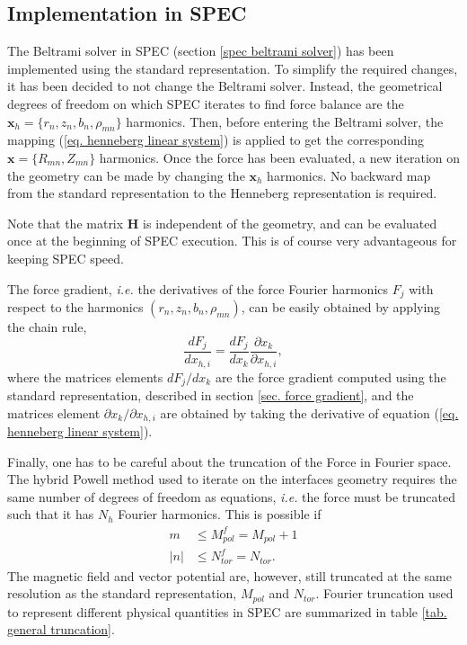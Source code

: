 \documentclass[my_thesis.tex]{subfiles}
\begin{document}
\subsection{Implementation in SPEC}
The Beltrami solver in SPEC (section \ref{spec beltrami solver}) has been implemented using the standard representation. To simplify the required changes, it has been decided to not change the Beltrami solver. Instead, the geometrical degrees of freedom on which SPEC iterates to find force balance are the $\mathbf{x}_h=\{r_n,z_n,b_n,\rho_{mn}\}$ harmonics. Then, before entering the Beltrami solver, the mapping (\ref{eq. henneberg linear system}) is applied to get the corresponding $\mathbf{x}=\{R_{mn},Z_{mn}\}$ harmonics. Once the force has been evaluated, a new iteration on the geometry can be made by changing the $\mathbf{x}_h$ harmonics. No backward map from the standard representation to the Henneberg representation is required.

Note that the matrix $\mathbf{H}$ is independent of the geometry, and can be evaluated once at the beginning of SPEC execution. This is of course very advantageous for keeping SPEC speed.

The force gradient, \textit{i.e.} the derivatives of the force Fourier harmonics $F_j$ with respect to the harmonics $(r_n,z_n,b_n,\rho_{mn})$, can be easily obtained by applying the chain rule,
\begin{equation}
	\frac{dF_j}{dx_{h,i}} = \frac{dF_j}{dx_k}\frac{\partial x_k}{\partial x_{h,i}},
\end{equation}
where the matrices elements $dF_j/dx_k$ are the force gradient computed using the standard representation, described in section \ref{sec. force gradient}, and the matrices element $\partial x_k/\partial x_{h,i}$ are obtained by taking the derivative of equation (\ref{eq. henneberg linear system}).

Finally, one has to be careful about the truncation of the Force in Fourier space. The hybrid Powell method used to iterate on the interfaces geometry requires the same number of degrees of freedom as equations, \textit{i.e.} the force must be truncated such that it has $N_h$ Fourier harmonics. This is possible if 
\begin{align}
	m&\leq M^f_{pol}= M_{pol}+1\label{eq.poloidal force truncation}\\ 
	|n|&\leq N^f_{tor}= N_{tor}.\label{eq.toroidal force truncation}
\end{align}
The magnetic field and vector potential are, however, still truncated at the same resolution as the standard representation, $M_{pol}$ and $N_{tor}$. Fourier truncation used to represent different physical quantities in SPEC are summarized in table \ref{tab. general truncation}.
\end{document}

